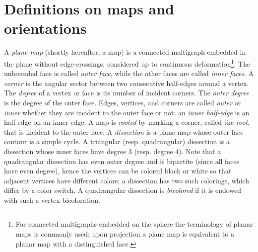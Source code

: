 \documentclass[letter]{amsart}
\numberwithin{theo}{section}
\theoremstyle{remark}
\begin{document}
  




\section{Definitions on maps and orientations}
A \emph{plane map} (shortly hereafter, a map) is a connected multigraph embedded in the plane without edge-crossings, considered up to continuous deformation\footnote{For connected multigraphs embedded on the sphere the terminology of planar maps is commonly used; upon projection a plane map is equivalent to a planar map with a distinguished face.}. The unbounded face is called \emph{outer face}, while the other faces are called \emph{inner faces}. A \emph{corner} is the angular sector between two consecutive half-edges around a vertex. The \emph{degree} of a vertex or face is its number of incident corners. The \emph{outer degree} is the degree of the outer face. 
Edges, vertices, and corners are called \emph{outer} or \emph{inner} whether they are incident to the outer face or not; an \emph{inner half-edge} is an half-edge on an inner edge. A map is \emph{rooted} by marking a corner, called the \emph{root}, that is incident to the outer face.
A \emph{dissection} is a plane map whose outer face contour is a simple cycle. A triangular (resp. quadrangular) dissection is a dissection whose inner faces have degree $3$ (resp. degree $4$). Note that a quadrangular dissection has even outer degree and is bipartite (since all faces have even degree), hence the vertices can be colored black or white so that adjacent vertices have different colors; a dissection has two such colorings, which differ by a color switch.  
A quadrangular dissection is \emph{bicolored} if it is endowed with such a vertex bicoloration. 
\end{document}
